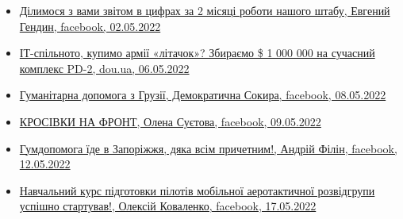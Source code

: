 \begin{itemize}
\item \hyperlink{02_05_2022.fb.gendin_evgenij.dnepropetrovsk.1.zvit}{%
Ділимося з вами звітом в цифрах за 2 місяці роботи нашого штабу, Евгений Гендин, facebook, 02.05.2022%
}

\item \hyperlink{06_05_2022.stz.pc.ua.dou.1.litachok}{%
ІТ-спільното, купимо армії «літачок»? Збираємо \$ 1 000 000 на сучасний комплекс PD-2, dou.ua, 06.05.2022%
}

\item \hyperlink{08_05_2022.fb.demsokyra.1.gumdopomoga_gruzia}{%
Гуманітарна допомога з Грузії, Демократична Сокира, facebook, 08.05.2022
}

\item \hyperlink{09_05_2022.fb.suetova_olena.kiev.1.krosivky_na_front}{%
КРОСІВКИ НА ФРОНТ, Олена Суєтова, facebook, 09.05.2022%
}

\item \hyperlink{12_05_2022.fb.filin_andrej.kiev.1.gumdopomoga}{%
Гумдопомога їде в Запоріжжя, дяка всім причетним!, Андрій Філін, facebook, 12.05.2022%
}

\item \hyperlink{17_05_2022.fb.kovalenko_oleksij.kiev.1.kurs_piloty}{%
Навчальний курс підготовки пілотів мобільної аеротактичної розвідгрупи успішно стартував!, Олексій Коваленко, %
facebook, 17.05.2022%
}

\end{itemize} %
